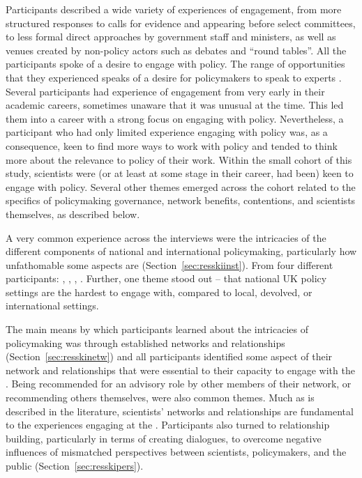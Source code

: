 Participants described a wide variety of experiences of engagement, from more structured responses to calls for evidence and appearing before select committees, to less formal direct approaches by government staff and ministers, as well as venues created by non-policy actors such as debates and ``round tables''. All the participants spoke of a desire to engage with policy. 
The range of opportunities that they experienced speaks of a desire for policymakers to speak to experts%
. Several participants had experience of \SPI{} engagement from very early in their academic careers, sometimes unaware that it was unusual at the time. This led them into a career with a strong focus on engaging with policy. Nevertheless, a participant who had only limited experience engaging with policy was, as a consequence, keen to find more ways to work with policy and tended to think more about the relevance to policy of their work. Within the small cohort of this study, scientists were (or at least at some stage in their career, had been) keen to engage with policy. Several other themes emerged across the cohort related to the specifics of policymaking governance, network benefits, \CAN{} contentions, and scientists themselves, as described below. 

A very common experience across the interviews were the intricacies of the different components of national and international policymaking, particularly how unfathomable some aspects are (Section~\ref{sec:resskiinst}). From four different participants: , , , . Further, one theme stood out -- that national UK policy settings are the hardest to engage with, compared to local, devolved, or international settings.

The main means by which participants learned about the intricacies of policymaking was through established networks and relationships (Section~\ref{sec:resskinetw}) and all participants identified some aspect of their network and relationships that were essential to their capacity to engage with the \SPI. Being recommended for an advisory role by other members of their network, or recommending others themselves, were also common themes. Much as is described in the literature, scientists' networks and relationships are fundamental to the experiences engaging at the \SPI. Participants also turned to relationship building, particularly in terms of creating dialogues, to overcome negative influences of mismatched perspectives between scientists, policymakers, and the public  (Section~\ref{sec:resskipers}).

